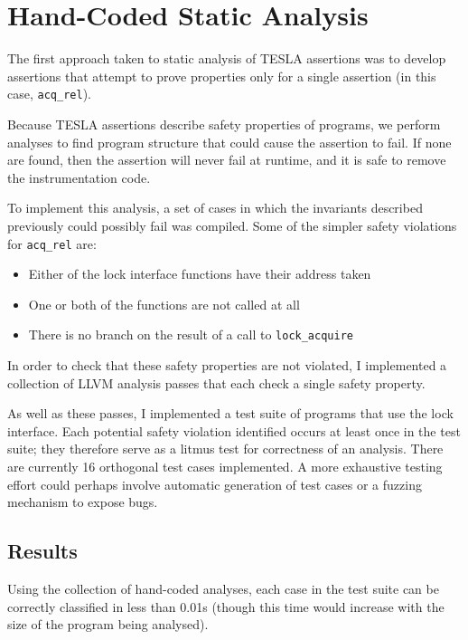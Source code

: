 \section{Hand-Coded Static Analysis} \label{sec:hand-coded}

The first approach taken to static analysis of TESLA assertions was to develop
 assertions that attempt to prove properties only for a
single assertion (in this case, \texttt{acq_rel}).

Because TESLA assertions describe safety properties of programs, we
perform analyses to find program structure that could cause the
assertion to fail. If none are found, then the assertion will never fail
at runtime, and it is safe to remove the instrumentation code.

To implement this analysis, a set of cases in which the invariants described
previously could possibly fail was compiled. Some of the simpler safety
violations for \texttt{acq_rel} are:
\begin{itemize}
  \item Either of the lock interface functions have their address taken
  \item One or both of the functions are not called at all
  \item There is no branch on the result of a call to
  \texttt{lock_acquire}
\end{itemize}

In order to check that these safety properties are not violated, I implemented a
collection of LLVM \cite{lattner_llvm:_2002} analysis passes that each check a
single safety property. 

As well as these passes, I implemented a test suite of programs that use the
lock interface. Each potential safety violation identified occurs at least once
in the test suite; they therefore serve as a litmus test for correctness of an
analysis. There are currently 16 orthogonal test cases implemented. A more
exhaustive testing effort could perhaps involve automatic generation of test
cases or a fuzzing mechanism to expose bugs.

\subsection{Results}

Using the collection of hand-coded analyses, each case in the test suite
can be correctly classified in less than \num{0.01}\si{\second} (though
this time would increase with the size of the program being analysed).

